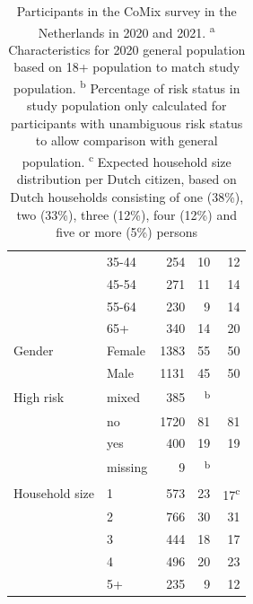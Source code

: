 \documentclass[fleqn,10pt]{wlscirep}
\begin{document}
\begin{table}[ht]
\begin{tabular}{llrrr}
   & 35-44 & 254 & 10 & 12 \\ 
   & 45-54 & 271 & 11 & 14 \\ 
   & 55-64 & 230 & 9 & 14 \\ 
   & 65+ & 340 & 14 & 20 \\ 
  \hline
  Gender & Female & 1383 & 55 & 50 \\ 
   & Male & 1131 & 45 & 50 \\ 
  \hline
  High risk & mixed & 385 & \textsuperscript{b} &  \\ 
   & no & 1720 & 81 & 81 \\ 
   & yes & 400 & 19 & 19 \\ 
   & missing & 9 & \textsuperscript{b} &  \\ 
  \hline
  Household size & 1 & 573 & 23 & 17\textsuperscript{c} \\ 
   & 2 & 766 & 30 & 31 \\ 
   & 3 & 444 & 18 & 17 \\ 
   & 4 & 496 & 20 & 23 \\ 
   & 5+ & 235 & 9 & 12 \\ 
  \hline
  \hline
\end{tabular}
\caption{\label{tab:part}Participants in the CoMix survey in the Netherlands in 2020 and 2021.
 \protect\linebreak \textsuperscript{a} Characteristics for 2020 general population based on 18+ population to match study population.
 \protect\linebreak \textsuperscript{b} Percentage of risk status in study population only calculated for participants with unambiguous risk status to allow comparison with general population.
\protect\linebreak \textsuperscript{c} Expected household size distribution per Dutch citizen, based on Dutch households consisting of one (38\%), two (33\%), three (12\%), four (12\%) and five or more (5\%) persons \cite{Backer_2021}}
\end{table}



\clearpage
\end{document}

